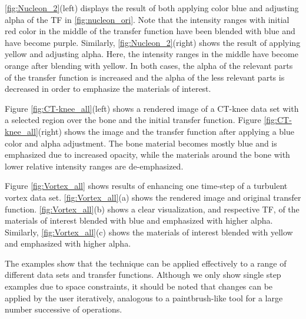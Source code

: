 \documentclass[twoside,twocolumn,10pt]{article}
\begin{document}
\autoref{fig:Nucleon_2}(left) displays the result of both applying color blue and adjusting alpha of the TF in \autoref{fig:nucleon_ori}. Note that the intensity ranges with initial red color in the middle of the transfer function have been blended with blue and have become purple.
Similarly, \autoref{fig:Nucleon_2}(right) shows the result of applying yellow and adjusting alpha. Here, the intensity ranges in the middle have become orange after blending with yellow. 
In both cases, the alpha of the relevant parts of the transfer function is increased and the alpha of the less relevant parts is decreased in order to emphasize the materials of interest.

Figure \ref{fig:CT-knee_all}(left) shows a rendered image of a CT-knee data set with a selected region over the bone and the initial transfer function. Figure \ref{fig:CT-knee_all}(right) shows the image and the transfer function after applying a blue color and alpha adjustment. The bone material becomes mostly blue and is emphasized due to increased opacity, while the materials around the bone with lower relative intensity ranges are de-emphasized.

Figure \ref{fig:Vortex_all} shows results of enhancing one time-step of a turbulent vortex data set.
\autoref{fig:Vortex_all}(a) shows the rendered image and original transfer function.
\autoref{fig:Vortex_all}(b) shows a clear visualization, and respective TF, of the materials of interest blended with blue and emphasized with higher alpha.
Similarly, \autoref{fig:Vortex_all}(c) shows the materials of interest blended with yellow and emphasized with higher alpha.

The examples show that the technique can be applied effectively to a range of different data sets and transfer functions. Although we only show single step examples due to space constraints, it should be noted that changes can be applied by the user iteratively, analogous to a paintbrush-like tool for a large number successive of operations.
\end{document}
